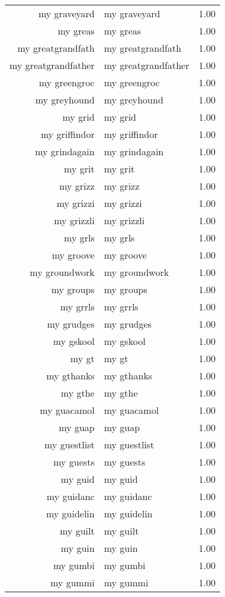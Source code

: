 \begin{table}[ht]
\begin{tabular}{rlr}
  my graveyard & my graveyard & 1.00 \\ 
  my greas & my greas & 1.00 \\ 
  my greatgrandfath & my greatgrandfath & 1.00 \\ 
  my greatgrandfather & my greatgrandfather & 1.00 \\ 
  my greengroc & my greengroc & 1.00 \\ 
  my greyhound & my greyhound & 1.00 \\ 
  my grid & my grid & 1.00 \\ 
  my griffindor & my griffindor & 1.00 \\ 
  my grindagain & my grindagain & 1.00 \\ 
  my grit & my grit & 1.00 \\ 
  my grizz & my grizz & 1.00 \\ 
  my grizzi & my grizzi & 1.00 \\ 
  my grizzli & my grizzli & 1.00 \\ 
  my grls & my grls & 1.00 \\ 
  my groove & my groove & 1.00 \\ 
  my groundwork & my groundwork & 1.00 \\ 
  my groups & my groups & 1.00 \\ 
  my grrls & my grrls & 1.00 \\ 
  my grudges & my grudges & 1.00 \\ 
  my gskool & my gskool & 1.00 \\ 
  my gt & my gt & 1.00 \\ 
  my gthanks & my gthanks & 1.00 \\ 
  my gthe & my gthe & 1.00 \\ 
  my guacamol & my guacamol & 1.00 \\ 
  my guap & my guap & 1.00 \\ 
  my guestlist & my guestlist & 1.00 \\ 
  my guests & my guests & 1.00 \\ 
  my guid & my guid & 1.00 \\ 
  my guidanc & my guidanc & 1.00 \\ 
  my guidelin & my guidelin & 1.00 \\ 
  my guilt & my guilt & 1.00 \\ 
  my guin & my guin & 1.00 \\ 
  my gumbi & my gumbi & 1.00 \\ 
  my gummi & my gummi & 1.00 \\ 

\end{tabular}
\end{table}
